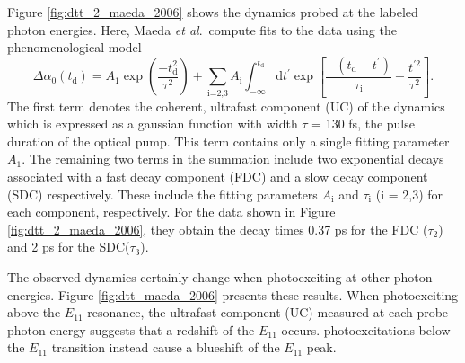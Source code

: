 Figure \ref{fig:dtt_2_maeda_2006} shows the dynamics probed at the labeled photon energies. Here, Maeda \textit{et al}.\ compute fits to the data using the phenomenological model
\begin{equation}
	\Delta \alpha_0(t_\text{d}) = A_1 \exp\left( \frac{-t_\text{d}^2}{\tau^2}\right) + \sum_\text{i=2,3} A_\text{i} \int^{t_\text{d}}_{-\infty} \mathrm{d} t^\prime \exp\left[ \frac{-(t_\text{d} - t^\prime)}{\tau_\text{i}} - \frac{t^{\prime 2}}{\tau^2}\right].
	\label{eq:fits_maeda_2006}
\end{equation}
The first term denotes the coherent, ultrafast component (UC) of the dynamics which is expressed as a gaussian function with width $\tau$ = 130 fs, the pulse duration of the optical pump. This term contains only a single fitting parameter $A_1$. The remaining two terms in the summation include two exponential decays associated with a fast decay component (FDC) and a slow decay component (SDC) respectively. These include the fitting parameters $A_\text{i}$ and $\tau_\text{i}$ (i = 2,3) for each component, respectively. For the data shown in Figure \ref{fig:dtt_2_maeda_2006}, they obtain the decay times 0.37 ps for the FDC ($\tau_2$) and 2 ps for the SDC($\tau_3$).

The observed dynamics certainly change when photoexciting at other photon energies. Figure \ref{fig:dtt_maeda_2006} presents these results. When photoexciting above the $E_{11}$ resonance, the ultrafast component (UC) measured at each probe photon energy suggests that a redshift of the $E_{11}$ occurs. photoexcitations below the $E_{11}$ transition instead cause a blueshift of the $E_{11}$ peak.


